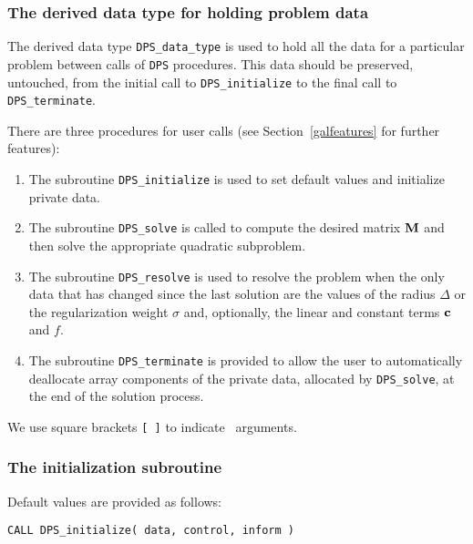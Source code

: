 \documentclass{galahad}
\newcommand{\packagename}{DPS}
\begin{document}

\subsubsection{The derived data type for holding problem data}\label{typedata}
The derived data type
{\tt \packagename\_data\_type}
is used to hold all the data for a particular problem between calls of
{\tt \packagename} procedures.
This data should be preserved, untouched, from the initial call to
{\tt \packagename\_initialize}
to the final call to
{\tt \packagename\_terminate}.


\galarguments
There are three procedures for user calls
(see Section~\ref{galfeatures} for further features):

\begin{enumerate}
\item The subroutine
      {\tt \packagename\_initialize}
      is used to set default values and initialize private data.
\item The subroutine
      {\tt \packagename\_solve}
      is called to compute the desired matrix ${\mathbf{M}}$ and then solve the
      appropriate quadratic subproblem.
\item The subroutine
      {\tt \packagename\_resolve}
      is used to resolve the problem when
      the only data that has changed since the last solution are the
      values of the radius $\Delta$ or the regularization weight $\sigma$
      and, optionally, the linear and constant terms ${\mathbf{c}}$ and $f$.
\item The subroutine
      {\tt \packagename\_terminate}
      is provided to allow the user to automatically deallocate array
       components of the private data, allocated by
       {\tt \packagename\_solve},
       at the end of the solution process.
\end{enumerate}
We use square brackets {\tt [ ]} to indicate \optional\ arguments.


\subsubsection{The initialization subroutine}\label{subinit}
 Default values are provided as follows:

\hskip0.5in
{\tt CALL \packagename\_initialize( data, control, inform )}
\end{document}

